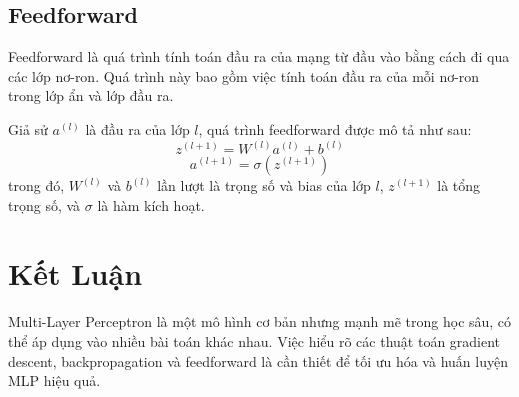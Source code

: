 \documentclass[a4paper, 12pt]{article}
\begin{document}
\subsection{Feedforward}

Feedforward là quá trình tính toán đầu ra của mạng từ đầu vào bằng cách đi qua các lớp nơ-ron. Quá trình này bao gồm việc tính toán đầu ra của mỗi nơ-ron trong lớp ẩn và lớp đầu ra.

Giả sử \(a^{(l)}\) là đầu ra của lớp \(l\), quá trình feedforward được mô tả như sau:
\[
z^{(l+1)} = W^{(l)}a^{(l)} + b^{(l)}
\]
\[
a^{(l+1)} = \sigma(z^{(l+1)})
\]
trong đó, \(W^{(l)}\) và \(b^{(l)}\) lần lượt là trọng số và bias của lớp \(l\), \(z^{(l+1)}\) là tổng trọng số, và \(\sigma\) là hàm kích hoạt.

\section{Kết Luận}

Multi-Layer Perceptron là một mô hình cơ bản nhưng mạnh mẽ trong học sâu, có thể áp dụng vào nhiều bài toán khác nhau. Việc hiểu rõ các thuật toán gradient descent, backpropagation và feedforward là cần thiết để tối ưu hóa và huấn luyện MLP hiệu quả.
\end{document}
